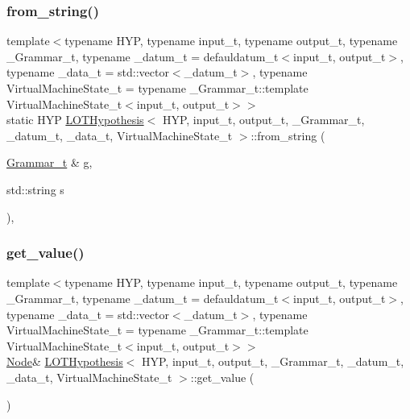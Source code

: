 \subsubsection{\texorpdfstring{from\+\_\+string()}{from\_string()}}
{\footnotesize\ttfamily template$<$typename H\+YP, typename input\+\_\+t, typename output\+\_\+t, typename \+\_\+\+Grammar\+\_\+t, typename \+\_\+datum\+\_\+t = defauldatum\+\_\+t$<$input\+\_\+t, output\+\_\+t$>$, typename \+\_\+data\+\_\+t = std\+::vector$<$\+\_\+datum\+\_\+t$>$, typename Virtual\+Machine\+State\+\_\+t = typename \+\_\+\+Grammar\+\_\+t\+::template Virtual\+Machine\+State\+\_\+t$<$input\+\_\+t, output\+\_\+t$>$$>$ \\
static H\+YP \hyperlink{class_l_o_t_hypothesis}{L\+O\+T\+Hypothesis}$<$ H\+YP, input\+\_\+t, output\+\_\+t, \+\_\+\+Grammar\+\_\+t, \+\_\+datum\+\_\+t, \+\_\+data\+\_\+t, Virtual\+Machine\+State\+\_\+t $>$\+::from\+\_\+string (\begin{DoxyParamCaption}\item[{\hyperlink{class_l_o_t_hypothesis_a8006204013d471860e54c49d19edbace}{Grammar\+\_\+t} \&}]{g,  }\item[{std\+::string}]{s }\end{DoxyParamCaption})\hspace{0.3cm}{\ttfamily [inline]}, {\ttfamily [static]}}

\mbox{\label{class_l_o_t_hypothesis_a1e3549444ffc1c34768a15f510ea0888}} 
\subsubsection{\texorpdfstring{get\+\_\+value()}{get\_value()}\hspace{0.1cm}{\footnotesize\ttfamily [1/2]}}
{\footnotesize\ttfamily template$<$typename H\+YP, typename input\+\_\+t, typename output\+\_\+t, typename \+\_\+\+Grammar\+\_\+t, typename \+\_\+datum\+\_\+t = defauldatum\+\_\+t$<$input\+\_\+t, output\+\_\+t$>$, typename \+\_\+data\+\_\+t = std\+::vector$<$\+\_\+datum\+\_\+t$>$, typename Virtual\+Machine\+State\+\_\+t = typename \+\_\+\+Grammar\+\_\+t\+::template Virtual\+Machine\+State\+\_\+t$<$input\+\_\+t, output\+\_\+t$>$$>$ \\
\hyperlink{class_node}{Node}\& \hyperlink{class_l_o_t_hypothesis}{L\+O\+T\+Hypothesis}$<$ H\+YP, input\+\_\+t, output\+\_\+t, \+\_\+\+Grammar\+\_\+t, \+\_\+datum\+\_\+t, \+\_\+data\+\_\+t, Virtual\+Machine\+State\+\_\+t $>$\+::get\+\_\+value (\begin{DoxyParamCaption}{ }\end{DoxyParamCaption})\hspace{0.3cm}{\ttfamily [inline]}}

